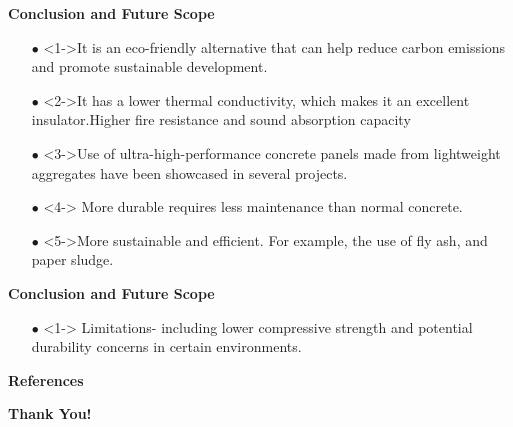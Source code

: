\documentclass[aspectratio=169]{beamer}
\begin{document}
  \begin{frame}{\textbf{Conclusion and Future Scope}}
      \begin{itemize}
          \large\item[$\bullet$] <1->It is an eco-friendly alternative that can help reduce carbon emissions and promote sustainable development.
           \vspace{0.4cm}
          \large\item[$\bullet$]<2->It has a lower thermal conductivity, which makes it an excellent insulator.Higher fire resistance and sound absorption capacity
           \vspace{0.4cm}
          \large\item[$\bullet$] <3->Use of ultra-high-performance concrete panels made from lightweight
aggregates have been showcased in several projects.
         \vspace{0.4cm}
         \item[$\bullet$]<4-> More durable requires less maintenance than normal concrete.
         \vspace{0.4cm}
         \item[$\bullet$]<5->More sustainable and efficient.
For example, the use of fly ash, and paper sludge\cite{su132413893}.
          \end{itemize}
  \end{frame}
  \begin{frame}{\textbf{Conclusion and Future Scope}}
      \begin{itemize}
          \item [$\bullet$] <1-> Limitations- including lower compressive strength and potential durability concerns in certain environments.
      \end{itemize}
  \end{frame}
  
  \begin{frame}{\textbf{References}}
  
  
\thispagestyle{empty}


\thispagestyle{empty}

  \end{frame}
\begin{frame}{}
\thispagestyle{empty}
    \begin{center}
        \textbf{\textcolor{teal!80}{\huge  Thank You!}}
    \end{center}
\end{frame}
\end{document}
